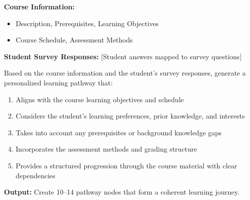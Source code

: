 \documentclass{stylefiles/capstone}
\begin{document}
\begin{tcolorbox}[breakable, colframe=customcolor, colback=customcolor!30!white, coltitle=black, title=Pathway Generation Prompt, fontupper=\small, label={box:user_query_prompt}]
\textbf{Course Information:}
\begin{itemize}
    \item Description, Prerequisites, Learning Objectives
    \item Course Schedule, Assessment Methods
\end{itemize}

\vspace{0.5em}
\textbf{Student Survey Responses:} [Student answers mapped to survey questions]

\vspace{0.5em}
Based on the course information and the student's survey responses, generate a personalized learning pathway that:

\begin{enumerate}
    \item Aligns with the course learning objectives and schedule
    \item Considers the student's learning preferences, prior knowledge, and interests
    \item Takes into account any prerequisites or background knowledge gaps
    \item Incorporates the assessment methods and grading structure
    \item Provides a structured progression through the course material with clear dependencies
\end{enumerate}

\vspace{0.5em}
\textbf{Output:} Create 10--14 pathway nodes that form a coherent learning journey.

\end{tcolorbox}



\end{document}
